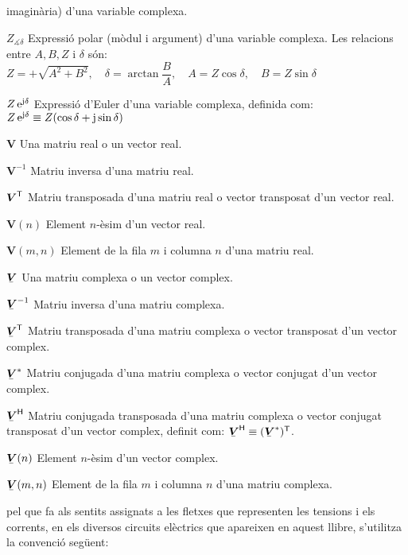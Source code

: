 \begin{list}{}
    imagin\`{a}ria) d'una variable complexa.
    \item[$Z_{\measuredangle \delta}$] Expressi\'{o} polar (m\`{o}dul i argument) d'una variable
    complexa. Les relacions entre $A, B, Z$ i $\delta$ s\'{o}n:\\[1ex]
    $Z=+\sqrt{A^2+B^2},\quad\delta=\arctan{\dfrac{B}{A}},\quad
    A=Z\cos\delta,\quad B=Z\sin\delta$
    \item[$Z\,\mathrm{e}^{\mathrm{j}\delta}$] Expressi\'{o} d'Euler d'una variable complexa, definida com:
     $Z\,\mathrm{e}^{\mathrm{j}\delta} \equiv Z(\cos\delta+\mathrm{j}\sin\delta)$
    \item[$\boldsymbol{V}$] Una matriu real o un vector real.
    \item[$\boldsymbol{V}^{-1}$] Matriu inversa d'una matriu real.
    \item[$\boldsymbol{V}^\mathrm{\textsf{T}}$] Matriu transposada d'una matriu real o vector
    transposat d'un vector real.
    \item[$\boldsymbol{V}(n)$] Element $n$-\`{e}sim d'un vector real.
    \item[$\boldsymbol{V}(m,n)$] Element de la fila $m$ i columna $n$ d'una matriu real.
    \item[$\mcmplx{V}$] Una matriu complexa o un vector complex.
    \item[$\mcmplx{V}^{-1}$] Matriu inversa d'una matriu complexa.
    \item[$\transp{\mcmplx{V}}$] Matriu transposada d'una matriu complexa o vector
    transposat d'un vector complex.
    \item[$\mcmplx{V}^*$] Matriu conjugada d'una matriu complexa o vector
    conjugat d'un vector complex.
    \item[$\hermit{V}$] Matriu conjugada transposada d'una matriu complexa o vector
    conjugat transposat d'un vector complex, definit com: $\hermit{V} \equiv
    \transp{(\mcmplx{V}^*)}$.
    \item[$\mcmplx{V}(n)$] Element $n$-\`{e}sim d'un vector complex.
    \item[$\mcmplx{V}(m,n)$] Element de la fila $m$ i columna $n$ d'una matriu complexa.
\end{list}

pel que fa als sentits assignats a les fletxes que representen les
tensions i els corrents, en els diversos circuits el\`{e}ctrics que
apareixen en aquest llibre, s'utilitza la convenci\'{o} seg\"{u}ent:

